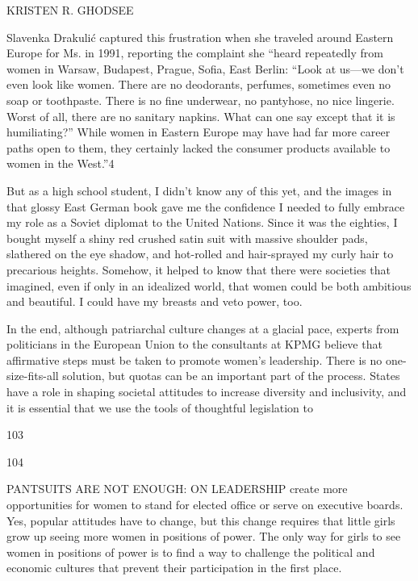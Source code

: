  \par 
KRISTEN R. GHODSEE
 \par 
Slavenka Drakulić captured this frustration when she traveled around Eastern Europe for Ms. in 1991, reporting the complaint she “heard repeatedly from women in Warsaw, Budapest, Prague, Sofia, East Berlin: “Look at us—we don’t even look like women. There are no deodorants, perfumes, sometimes even no soap or toothpaste. There is no fine underwear, no pantyhose, no nice lingerie. Worst of all, there are no sanitary napkins. What can one say except that it is humiliating?” While women in Eastern Europe may have had far more career paths open to them, they certainly lacked the consumer products available to women in the West.”{\color{blue}4}
 \par 
But as a high school student, I didn’t know any of this yet, and the images in that glossy East German book gave me the confidence I needed to fully embrace my role as a Soviet diplomat to the United Nations. Since it was the eighties, I bought myself a shiny red crushed satin suit with massive shoulder pads, slathered on the eye shadow, and hot-rolled and hair-sprayed my curly hair to precarious heights. Somehow, it helped to know that there were societies that imagined, even if only in an idealized world, that women could be both ambitious and beautiful. I could have my breasts and veto power, too.
 \par 
In the end, although patriarchal culture changes at a glacial pace, experts from politicians in the European Union to the consultants at KPMG believe that affirmative steps must be taken to promote women’s leadership. There is no one-size-fits-all solution, but quotas can be an important part of the process. States have a role in shaping societal attitudes to increase diversity and inclusivity, and it is essential that we use the tools of thoughtful legislation to
 \par 
103
 \par 
104
 \par 
PANTSUITS ARE NOT ENOUGH: ON LEADERSHIP create more opportunities for women to stand for elected office or serve on executive boards. Yes, popular attitudes have to change, but this change requires that little girls grow up seeing more women in positions of power. The only way for girls to see women in positions of power is to find a way to challenge the political and economic cultures that prevent their participation in the first place.
 \par 
